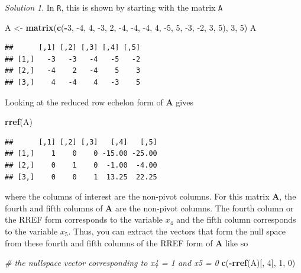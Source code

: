 \documentclass[
]{book}
\newenvironment{Shaded}{\begin{snugshade}}{\end{snugshade}}
\newcommand{\CommentTok}[1]{\textcolor[rgb]{0.56,0.35,0.01}{\textit{#1}}}
\newcommand{\DecValTok}[1]{\textcolor[rgb]{0.00,0.00,0.81}{#1}}
\newcommand{\KeywordTok}[1]{\textcolor[rgb]{0.13,0.29,0.53}{\textbf{#1}}}
\newcommand{\NormalTok}[1]{#1}
\newcommand{\OperatorTok}[1]{\textcolor[rgb]{0.81,0.36,0.00}{\textbf{#1}}}
\newcommand{\StringTok}[1]{\textcolor[rgb]{0.31,0.60,0.02}{#1}}
\theoremstyle{definition}
\theoremstyle{definition}
\theoremstyle{definition}
\theoremstyle{definition}
\theoremstyle{remark}
\newtheorem*{solution}{Solution}
\begin{document}
\begin{solution}
In \texttt{R}, this is shown by starting with the matrix \texttt{A}

\begin{Shaded}
\begin{Highlighting}[]
\NormalTok{A <-}\StringTok{ }\KeywordTok{matrix}\NormalTok{(}\KeywordTok{c}\NormalTok{(}\OperatorTok{-}\DecValTok{3}\NormalTok{, }\DecValTok{-4}\NormalTok{, }\DecValTok{4}\NormalTok{, }\DecValTok{-3}\NormalTok{, }\DecValTok{2}\NormalTok{, }\DecValTok{-4}\NormalTok{, }\DecValTok{-4}\NormalTok{, }\DecValTok{-4}\NormalTok{, }\DecValTok{4}\NormalTok{, }\DecValTok{-5}\NormalTok{, }\DecValTok{5}\NormalTok{, }\DecValTok{-3}\NormalTok{, }\DecValTok{-2}\NormalTok{, }\DecValTok{3}\NormalTok{, }\DecValTok{5}\NormalTok{), }\DecValTok{3}\NormalTok{, }\DecValTok{5}\NormalTok{)}
\NormalTok{A}
\end{Highlighting}
\end{Shaded}

\begin{verbatim}
##      [,1] [,2] [,3] [,4] [,5]
## [1,]   -3   -3   -4   -5   -2
## [2,]   -4    2   -4    5    3
## [3,]    4   -4    4   -3    5
\end{verbatim}

Looking at the reduced row echelon form of \(\mathbf{A}\) gives

\begin{Shaded}
\begin{Highlighting}[]
\KeywordTok{rref}\NormalTok{(A)}
\end{Highlighting}
\end{Shaded}

\begin{verbatim}
##      [,1] [,2] [,3]   [,4]   [,5]
## [1,]    1    0    0 -15.00 -25.00
## [2,]    0    1    0  -1.00  -4.00
## [3,]    0    0    1  13.25  22.25
\end{verbatim}

where the columns of interest are the non-pivot columns. For this matrix \(\mathbf{A}\), the fourth and fifth columns of \(\mathbf{A}\) are the non-pivot columns. The fourth column or the RREF form corresponds to the variable \(x_4\) and the fifth column corresponds to the variable \(x_5\). Thus, you can extract the vectors that form the null space from these fourth and fifth columns of the RREF form of \(\mathbf{A}\) like so

\begin{Shaded}
\begin{Highlighting}[]
\CommentTok{# the nullspace vector corresponding to x4 = 1 and x5 = 0}
\KeywordTok{c}\NormalTok{(}\OperatorTok{-}\KeywordTok{rref}\NormalTok{(A)[, }\DecValTok{4}\NormalTok{], }\DecValTok{1}\NormalTok{, }\DecValTok{0}\NormalTok{)}
\end{Highlighting}
\end{Shaded}


\end{solution}
\end{document}

